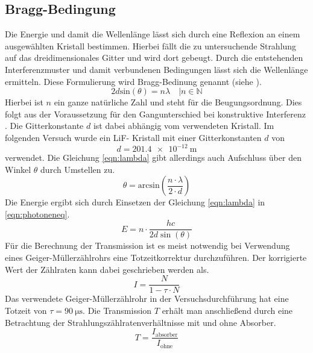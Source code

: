 \subsection{Bragg-Bedingung}
Die Energie und damit die Wellenlänge lässt sich durch eine Reflexion an einem ausgewählten Kristall bestimmen. Hierbei fällt die 
zu untersuchende Strahlung auf das dreidimensionales Gitter und wird dort gebeugt. Durch die entstehenden Interferenzmuster und damit verbundenen Bedingungen lässt sich
die Wellenlänge ermitteln. Diese Formulierung wird Bragg-Bedinung genannt (siehe \cite{skript4}).
\begin{equation}
\label{eqn:lambda}
2 d \text{sin}(\theta) =  n \lambda \quad | n \in \mathbb{N}
\end{equation}
Hierbei ist $n$ ein ganze natürliche Zahl und steht für die Beugungsordnung. Dies folgt aus der Voraussetzung für den Gangunterschied bei konstruktive Interferenz
. Die Gitterkonstante $d$ ist dabei abhängig vom verwendeten Kristall.
Im folgenden Versuch wurde ein LiF- Kristall mit einer Gitterkonstanten $d$ von
\begin{equation}
d = \SI{201.4e-12}{\meter}
\end{equation}
verwendet.
Die Gleichung \eqref{eqn:lambda} gibt allerdings auch Aufschluss über den Winkel $\theta$ durch Umstellen zu.
\begin{equation}
\label{eqn:winkelmitlambda}
\theta = \text{arcsin}\left(\frac{n \cdot \lambda}{2 \cdot d}\right)
\end{equation}
Die Energie ergibt sich durch Einsetzen der Gleichung \eqref{eqn:lambda} in \eqref{eqn:photoneneq}.
\begin{equation}
    \label{eqn:braggEnergy}
    E = n \cdot \frac{h c}{2 d \sin (\theta)}
\end{equation}
Für die Berechnung der Transmission ist es meist notwendig bei Verwendung eines Geiger-Müllerzählrohrs eine Totzeitkorrektur durchzuführen.
Der korrigierte Wert der Zählraten kann dabei geschrieben werden als.
\begin{equation}
\label{eqn:totzeit}
I = \frac{N}{1 - \tau \cdot N}
\end{equation}
Das verwendete Geiger-Müllerzählrohr in der Versuchsdurchführung hat eine Totzeit von $\tau = \SI{90}{\micro\second}$.
Die Transmission $T$ erhält man anschließend durch eine Betrachtung der Strahlungszählratenverhältnisse mit und ohne Absorber.
\begin{equation}
\label{eqn:wichtig}
T = \frac{I_{\text{absorber}}}{I_{\text{ohne}}}
\end{equation}

